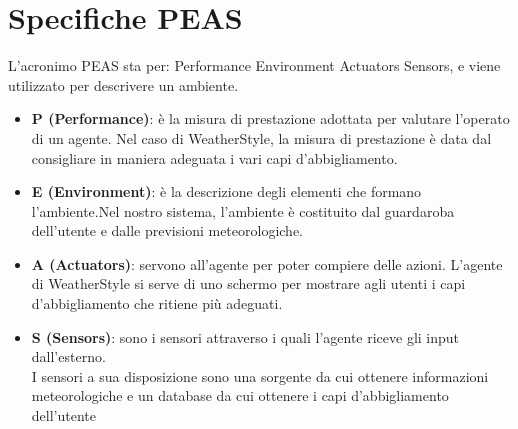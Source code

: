 \documentclass[a4paper, 11pt, oneside]{report}
\begin{document}
            \section{Specifiche PEAS}
            L'acronimo PEAS sta per: Performance Environment Actuators Sensors, e viene utilizzato per descrivere un ambiente.
            \begin{itemize}
                \item \textbf{P (Performance)}: è la misura di prestazione adottata per valutare l'operato di un agente.
                Nel caso di WeatherStyle, la misura di prestazione è data dal consigliare in maniera adeguata i vari capi
                d'abbigliamento.
                \item \textbf{E (Environment)}: è la descrizione degli elementi che formano l'ambiente.Nel nostro
                sistema, l'ambiente è costituito dal guardaroba dell'utente e dalle previsioni meteorologiche.
                \item \textbf{A (Actuators)}: servono all'agente per poter compiere delle azioni. L'agente di WeatherStyle
                si serve di uno schermo per mostrare agli utenti i capi d'abbigliamento che ritiene più adeguati.
                \item \textbf{S (Sensors)}: sono i sensori attraverso i quali l'agente riceve gli input dall'esterno.
                \\ I sensori a sua disposizione sono una sorgente da cui ottenere informazioni meteorologiche
                    e un database da cui ottenere i capi d'abbigliamento dell'utente
            \end{itemize}
\end{document}
